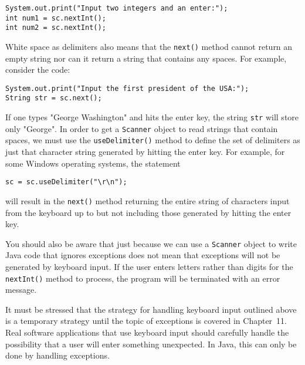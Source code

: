 \begin{jjjlisting}
\begin{lstlisting}
System.out.print("Input two integers and an enter:");  
int num1 = sc.nextInt();
int num2 = sc.nextInt();
\end{lstlisting}
\end{jjjlisting}

\noindent White space as delimiters also means that the {\tt next()} method
cannot return an empty string nor can it return a string that contains 
any spaces.  For example, consider the code:

\begin{jjjlisting}
\begin{lstlisting}
System.out.print("Input the first president of the USA:");  
String str = sc.next();
\end{lstlisting}
\end{jjjlisting}

\noindent If one types "George Washington" and hits the enter key, the string
{\tt str} will store only "George".  In order to get a {\tt Scanner}
object to read strings that contain spaces, we must use
the {\tt useDelimiter()} method to define the set of delimiters as 
just that character string generated by hitting the enter key.  For
example, for some Windows operating systems, the statement

\begin{jjjlisting}
\begin{lstlisting}
sc = sc.useDelimiter("\r\n"); 
\end{lstlisting}
\end{jjjlisting}

\noindent will result in the {\tt next()} method returning the entire string of
characters input from the keyboard up to but not including those
generated by hitting the enter key.

You should also be aware that just because we can use a {\tt Scanner}
object to write Java code that ignores exceptions does not mean that
exceptions will not be generated by keyboard input.  If the user
enters letters rather than digits for the {\tt nextInt()} method to
process, the program will be terminated with an error message.

It must be stressed that the strategy for handling keyboard input
outlined above is a temporary strategy until the topic of exceptions
is covered in Chapter~11.  Real software applications that use
keyboard input should carefully handle the possibility that a user
will enter something unexpected.  In Java, this can only be done by
handling exceptions.

